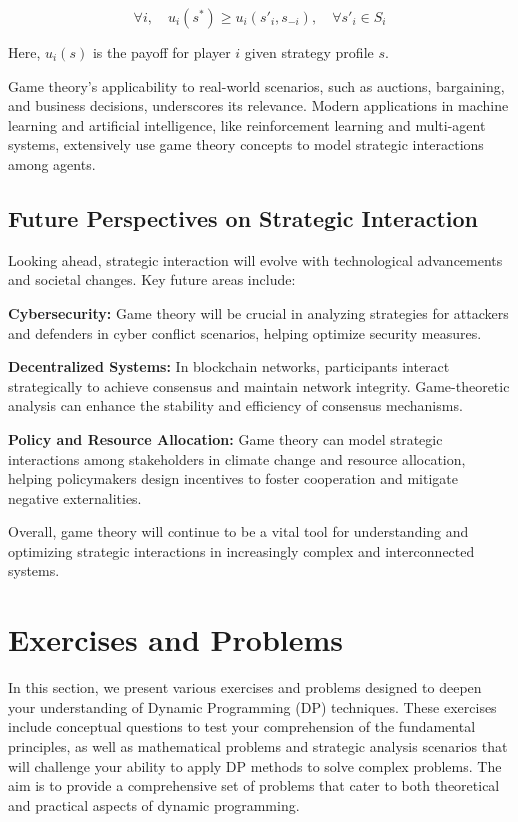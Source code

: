 \documentclass[12pt]{book} %
\begin{document}
\[
\forall i, \quad u_i(s^*) \geq u_i(s'_i, s_{-i}), \quad \forall s'_i \in S_i
\]

Here, $u_i(s)$ is the payoff for player $i$ given strategy profile $s$. 

Game theory's applicability to real-world scenarios, such as auctions, bargaining, and business decisions, underscores its relevance. Modern applications in machine learning and artificial intelligence, like reinforcement learning and multi-agent systems, extensively use game theory concepts to model strategic interactions among agents.

\subsection{Future Perspectives on Strategic Interaction}
Looking ahead, strategic interaction will evolve with technological advancements and societal changes. Key future areas include:

\textbf{Cybersecurity:} Game theory will be crucial in analyzing strategies for attackers and defenders in cyber conflict scenarios, helping optimize security measures.

\textbf{Decentralized Systems:} In blockchain networks, participants interact strategically to achieve consensus and maintain network integrity. Game-theoretic analysis can enhance the stability and efficiency of consensus mechanisms.

\textbf{Policy and Resource Allocation:} Game theory can model strategic interactions among stakeholders in climate change and resource allocation, helping policymakers design incentives to foster cooperation and mitigate negative externalities.

Overall, game theory will continue to be a vital tool for understanding and optimizing strategic interactions in increasingly complex and interconnected systems.


\section{Exercises and Problems}
In this section, we present various exercises and problems designed to deepen your understanding of Dynamic Programming (DP) techniques. These exercises include conceptual questions to test your comprehension of the fundamental principles, as well as mathematical problems and strategic analysis scenarios that will challenge your ability to apply DP methods to solve complex problems. The aim is to provide a comprehensive set of problems that cater to both theoretical and practical aspects of dynamic programming.
\end{document}
